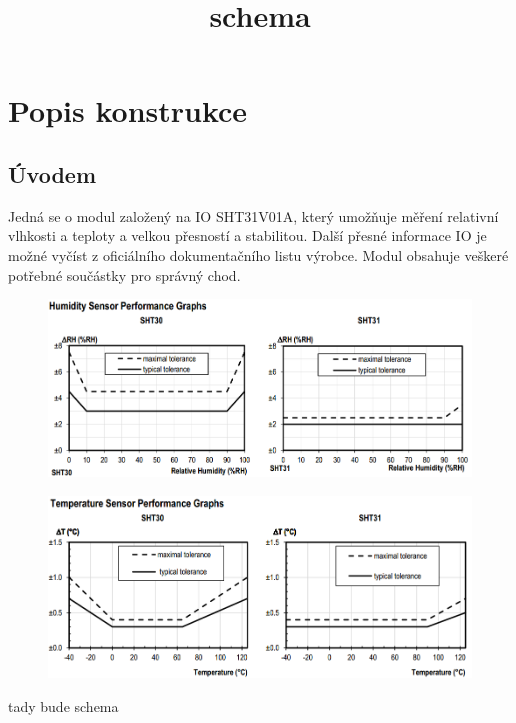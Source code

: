 \documentclass[12pt,a4paper]{article}
\begin{document}

\flushbottom
\newpage

\section{Popis konstrukce}\label{popis-konstrukce}

\subsection{Úvodem}\label{uxfavodem}

Jedná se o modul založený na IO SHT31V01A, který umožňuje měření
relativní vlhkosti a teploty a velkou přesností a stabilitou. Další
přesné informace IO je možné vyčíst z oficiálního dokumentačního listu
výrobce. Modul obsahuje veškeré potřebné součástky pro správný chod.

\begin{figure}[htbp]
\centering
\includegraphics{DOC/SRC/img/docA.jpg}
\caption{}
\end{figure}

\begin{figure}[htbp]
\centering
\includegraphics{DOC/SRC/img/docB.jpg}
\caption{}
\end{figure}

\newpage

\title{schema}

tady bude schema
\end{document}
